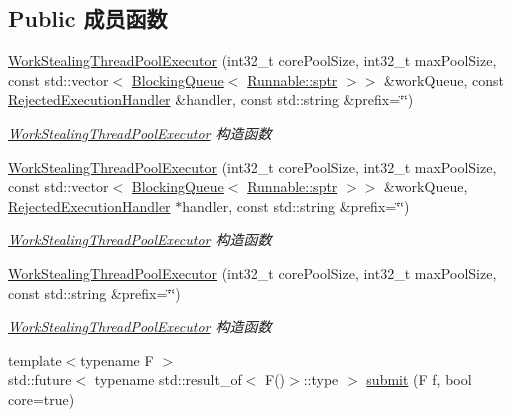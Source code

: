 \subsection*{Public 成员函数}
\begin{DoxyCompactItemize}
\item 
\hyperlink{classWorkStealingThreadPoolExecutor_a3e4e9fd05b5b325f2f051725410525cb}{Work\+Stealing\+Thread\+Pool\+Executor} (int32\+\_\+t core\+Pool\+Size, int32\+\_\+t max\+Pool\+Size, const std\+::vector$<$ \hyperlink{classBlockingQueue}{Blocking\+Queue}$<$ \hyperlink{classRunnable_abe8d3066c7305401d6f0aad8e70780f2}{Runnable\+::sptr} $>$$>$ \&work\+Queue, const \hyperlink{classRejectedExecutionHandler}{Rejected\+Execution\+Handler} \&handler, const std\+::string \&prefix=\char`\"{}\char`\"{})
\begin{DoxyCompactList}\small\item\em \hyperlink{classWorkStealingThreadPoolExecutor}{Work\+Stealing\+Thread\+Pool\+Executor} 构造函数 \end{DoxyCompactList}\item 
\hyperlink{classWorkStealingThreadPoolExecutor_a80c8e32259e498cbb2c5625b272d37f3}{Work\+Stealing\+Thread\+Pool\+Executor} (int32\+\_\+t core\+Pool\+Size, int32\+\_\+t max\+Pool\+Size, const std\+::vector$<$ \hyperlink{classBlockingQueue}{Blocking\+Queue}$<$ \hyperlink{classRunnable_abe8d3066c7305401d6f0aad8e70780f2}{Runnable\+::sptr} $>$$>$ \&work\+Queue, \hyperlink{classRejectedExecutionHandler}{Rejected\+Execution\+Handler} $\ast$handler, const std\+::string \&prefix=\char`\"{}\char`\"{})
\begin{DoxyCompactList}\small\item\em \hyperlink{classWorkStealingThreadPoolExecutor}{Work\+Stealing\+Thread\+Pool\+Executor} 构造函数 \end{DoxyCompactList}\item 
\hyperlink{classWorkStealingThreadPoolExecutor_adb702388a229cc2a0508901976dd9104}{Work\+Stealing\+Thread\+Pool\+Executor} (int32\+\_\+t core\+Pool\+Size, int32\+\_\+t max\+Pool\+Size, const std\+::string \&prefix=\char`\"{}\char`\"{})
\begin{DoxyCompactList}\small\item\em \hyperlink{classWorkStealingThreadPoolExecutor}{Work\+Stealing\+Thread\+Pool\+Executor} 构造函数 \end{DoxyCompactList}\item 
{\footnotesize template$<$typename F $>$ }\\std\+::future$<$ typename std\+::result\+\_\+of$<$ F()$>$\+::type $>$ \hyperlink{classWorkStealingThreadPoolExecutor_a7fa1b79c8be2b06a7952ccfd14aa7f6c}{submit} (F f, bool core=true)

\end{DoxyCompactItemize}
